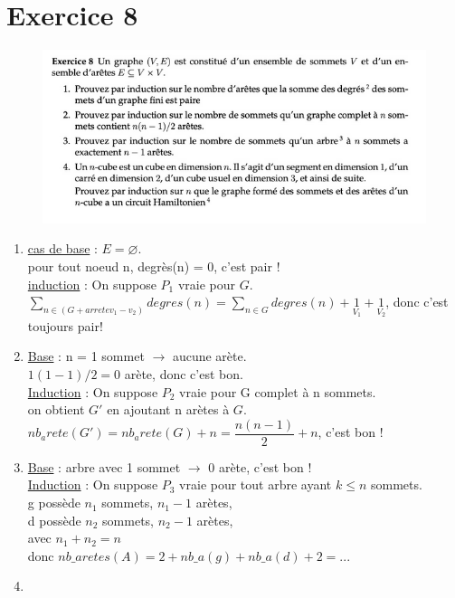 \documentclass[a4paper, draft]{article}
\begin{document}
\section*{Exercice 8}
 \begin{figure}[!h]
\includegraphics[scale=0.5]{ex8}
\end{figure}
\begin{enumerate}
  \item \underline{cas de base} : $E=\varnothing$.\\
    pour tout noeud n, degrès(n) = 0, c'est pair !\\
    \underline{induction} : On suppose $P_{1}$  vraie pour $G$.\\
    $\sum_{n\in (G + arrete v_{1}-v_{2})}degres(n) = \sum_{n\in G}degres(n) +\underset{V_{1}}{1} +\underset{V_{2}}{1}$, donc c'est toujours pair!\\
  \item \underline{Base} : n = 1 sommet $\longrightarrow$ aucune arète.\\
    $1(1-1)/2=0 $ arète, donc c'est bon.\\
    \underline{Induction} : On suppose $P_{2}$ vraie pour G complet à n sommets.\\
    on obtient $G'$ en ajoutant n arètes à $G$.\\
    $nb_arete(G') = nb_arete(G)+n=\dfrac{n(n-1)}{2}+n$, c'est bon !\\
  \item \underline{Base} : arbre avec 1 sommet $\longrightarrow$ 0 arète, c'est bon !\\
    \underline{Induction} : On suppose $P_{3}$ vraie pour tout arbre ayant $k\leq n$ sommets.\\
    g possède $n_{1}$ sommets, $n_{1}-1$ arètes,\\
    d possède $n_{2}$ sommets, $n_{2}-1$ arètes,\\
    avec $n_{1}+n_{2} = n$\\
    donc $nb\_{aretes(A)}=2+nb\_a(g)+nb\_{a}(d) + 2 = ...$\\
    \item
\end{enumerate}
\end{document}
